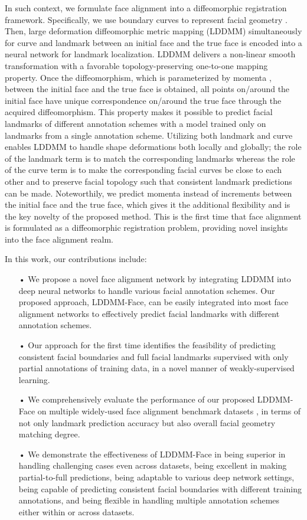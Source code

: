 \documentclass[10pt,twocolumn,letterpaper]{article}
\begin{document}
In such context, we 
formulate face alignment into a diffeomorphic registration framework. Specifically, we use boundary curves to represent facial geometry \cite{dupuis1998variational}. Then, large deformation diffeomorphic metric mapping (LDDMM) simultaneously for curve and landmark \cite{glaunes2008large,joshi2000landmark} between an initial face and the true face is encoded into a neural network for landmark localization. LDDMM delivers a non-linear smooth transformation with a favorable topology-preserving one-to-one mapping property. Once the diffeomorphism, which is parameterized by momenta \cite{dupuis1998variational,glaunes2008large,joshi2000landmark}, between the initial face and the true face is obtained, all points on/around the initial face have unique correspondence on/around the true face through the acquired diffeomorphism. This property makes it possible to predict facial landmarks of different annotation schemes with a model trained only on landmarks from a single annotation scheme. Utilizing both landmark and curve enables LDDMM to handle shape deformations both locally and globally; the role of the landmark term is to match the corresponding landmarks whereas the role of the curve term is to make the corresponding facial curves be close to each other and to preserve facial topology such that consistent landmark predictions can be made. Noteworthily, we predict momenta instead of increments between the initial face and the true face, which gives it the additional flexibility and is the key novelty of the proposed method. This is the first time that face alignment is formulated as a diffeomorphic registration problem, providing novel insights into the face alignment realm.


In this work, our contributions include: 
\begin{itemize}
\item[•] We propose a novel face alignment network by integrating LDDMM into deep neural networks to handle various facial annotation schemes. Our proposed approach, LDDMM-Face, can be easily integrated into most face alignment networks to effectively predict facial landmarks with different annotation schemes.
\item[•] Our approach for the first time identifies the feasibility of predicting consistent facial boundaries and full facial landmarks supervised with only partial annotations of training data, in a novel manner of weakly-supervised learning.
\item[•] We comprehensively evaluate the performance of our proposed LDDMM-Face on multiple widely-used face alignment benchmark datasets \cite{le2012interactive, Wu_2018_CVPR, sagonas2013300}, in terms of not only landmark prediction accuracy but also overall facial geometry matching degree.
\item[•] We demonstrate the effectiveness of LDDMM-Face in being superior in handling challenging cases even across datasets, being excellent in making partial-to-full predictions, being adaptable to various deep network settings, being capable of predicting consistent facial boundaries with different training annotations, and being flexible in handling multiple annotation schemes either within or across datasets. 
\end{itemize} 
\end{document}
